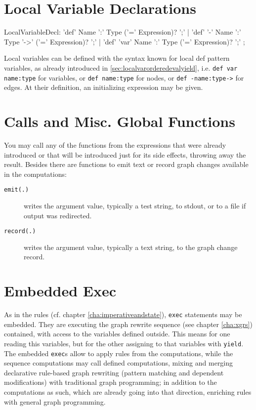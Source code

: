 
\section{Local Variable Declarations} 

\begin{rail} 
  LocalVariableDecl: 
	'def' Name ':' Type ('=' Expression)? ';' |
	'def' '-' Name ':' Type '->' ('=' Expression)? ';' |
	'def' 'var' Name ':' Type ('=' Expression)? ';'
	;
\end{rail}

Local variables can be defined with the syntax known for local def pattern variables, as already introduced in \ref{sec:localvarorderedevalyield}, i.e. \texttt{def var name:type} for variables, or \texttt{def name:type} for nodes, or \texttt{def -name:type->} for edges.
At their definition, an initializing expression may be given.

\section{Calls and Misc. Global Functions} 

You may call any of the functions from the expressions that were already introduced or that will be introduced just for its side effects, throwing away the result.
Besides there are functions to emit text or record graph changes available in the computations: 

\begin{description}
\item[\texttt{emit(.)}] writes the argument value, typically a test string, to stdout, or to a file if output was redirected. 
\item[\texttt{record(.)}] writes the argument value, typically a text string, to the graph change record.
\end{description}

\section{Embedded Exec} 

As in the rules (cf. chapter \ref{cha:imperativeandstate}), \texttt{exec} statements may be embedded.
They are executing the graph rewrite sequence (see chapter \ref{cha:xgrs}) contained, with access to the variables defined outside.
This means for one reading this variables, but for the other assigning to that variables with \texttt{yield}.
The embedded \texttt{exec}s allow to apply rules from the computations, while the sequence computations may call defined computations, mixing and merging declarative rule-based graph rewriting (pattern matching and dependent modifications) with traditional graph programming; in addition to the computations as such, which are already going into that direction, enriching rules with general graph programming.

